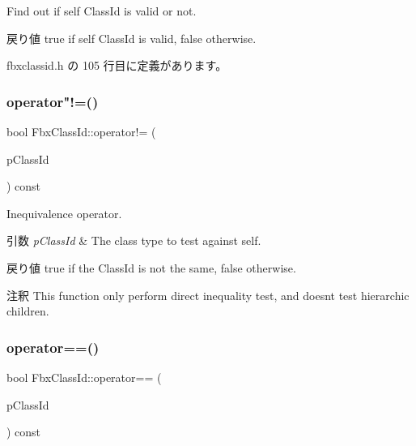 Find out if self Class\+Id is valid or not. \begin{DoxyReturn}{戻り値}
{\ttfamily true} if self Class\+Id is valid, {\ttfamily false} otherwise. 
\end{DoxyReturn}


 fbxclassid.\+h の 105 行目に定義があります。

\mbox{\label{class_fbx_class_id_a2743b7231681c0fbb92926842135e853}} 
\subsubsection{\texorpdfstring{operator"!=()}{operator!=()}}
{\footnotesize\ttfamily bool Fbx\+Class\+Id\+::operator!= (\begin{DoxyParamCaption}\item[{const \hyperlink{class_fbx_class_id}{Fbx\+Class\+Id} \&}]{p\+Class\+Id }\end{DoxyParamCaption}) const}

Inequivalence operator. 
\begin{DoxyParams}{引数}
{\em p\+Class\+Id} & The class type to test against self. \\
\hline
\end{DoxyParams}
\begin{DoxyReturn}{戻り値}
{\ttfamily true} if the Class\+Id is not the same, {\ttfamily false} otherwise. 
\end{DoxyReturn}
\begin{DoxyRemark}{注釈}
This function only perform direct inequality test, and doesn\textquotesingle{}t test hierarchic children. 
\end{DoxyRemark}
\mbox{\label{class_fbx_class_id_af52cd2e39251da6e43f5a5ce87151984}} 
\subsubsection{\texorpdfstring{operator==()}{operator==()}}
{\footnotesize\ttfamily bool Fbx\+Class\+Id\+::operator== (\begin{DoxyParamCaption}\item[{const \hyperlink{class_fbx_class_id}{Fbx\+Class\+Id} \&}]{p\+Class\+Id }\end{DoxyParamCaption}) const}

